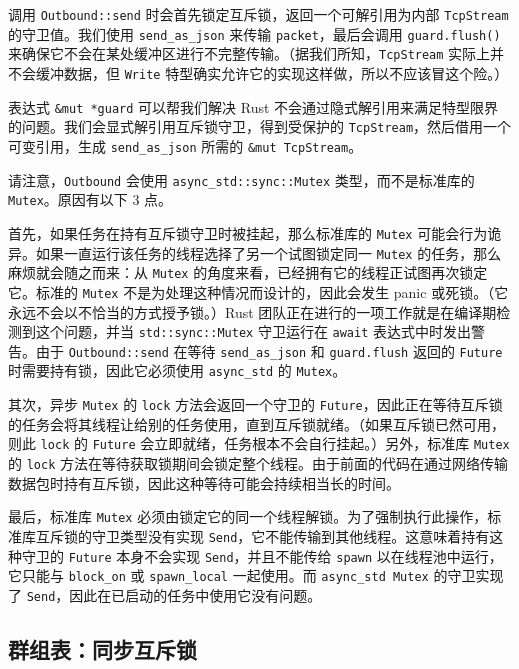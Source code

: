 调用 \texttt{Outbound::send} 时会首先锁定互斥锁，返回一个可解引用为内部 \texttt{TcpStream} 的守卫值。我们使用 \texttt{send\_as\_json} 来传输 \texttt{packet}，最后会调用 \texttt{guard.flush()} 来确保它不会在某处缓冲区进行不完整传输。（据我们所知，\texttt{TcpStream} 实际上并不会缓冲数据，但 \texttt{Write} 特型确实允许它的实现这样做，所以不应该冒这个险。）

表达式 \texttt{\&mut *guard} 可以帮我们解决 Rust 不会通过隐式解引用来满足特型限界的问题。我们会显式解引用互斥锁守卫，得到受保护的 \texttt{TcpStream}，然后借用一个可变引用，生成 \texttt{send\_as\_json} 所需的 \texttt{\&mut TcpStream}。

请注意，\texttt{Outbound} 会使用 \texttt{async\_std::sync::Mutex} 类型，而不是标准库的 \texttt{Mutex}。原因有以下 3 点。

首先，如果任务在持有互斥锁守卫时被挂起，那么标准库的 \texttt{Mutex} 可能会行为诡异。如果一直运行该任务的线程选择了另一个试图锁定同一 \texttt{Mutex} 的任务，那么麻烦就会随之而来：从 \texttt{Mutex} 的角度来看，已经拥有它的线程正试图再次锁定它。标准的 \texttt{Mutex} 不是为处理这种情况而设计的，因此会发生 panic 或死锁。（它永远不会以不恰当的方式授予锁。）Rust 团队正在进行的一项工作就是在编译期检测到这个问题，并当 \texttt{std::sync::Mutex} 守卫运行在 \texttt{await} 表达式中时发出警告。由于 \texttt{Outbound::send} 在等待 \texttt{send\_as\_json} 和 \texttt{guard.flush} 返回的 \texttt{Future} 时需要持有锁，因此它必须使用 \texttt{async\_std} 的 \texttt{Mutex}。

其次，异步 \texttt{Mutex} 的 \texttt{lock} 方法会返回一个守卫的 \texttt{Future}，因此正在等待互斥锁的任务会将其线程让给别的任务使用，直到互斥锁就绪。（如果互斥锁已然可用，则此 \texttt{lock} 的 \texttt{Future} 会立即就绪，任务根本不会自行挂起。）另外，标准库 \texttt{Mutex} 的 \texttt{lock} 方法在等待获取锁期间会锁定整个线程。由于前面的代码在通过网络传输数据包时持有互斥锁，因此这种等待可能会持续相当长的时间。

最后，标准库 \texttt{Mutex} 必须由锁定它的同一个线程解锁。为了强制执行此操作，标准库互斥锁的守卫类型没有实现 \texttt{Send}，它不能传输到其他线程。这意味着持有这种守卫的 \texttt{Future} 本身不会实现 \texttt{Send}，并且不能传给 \texttt{spawn} 以在线程池中运行，它只能与 \texttt{block\_on} 或 \texttt{spawn\_local} 一起使用。而 \texttt{async\_std Mutex} 的守卫实现了 \texttt{Send}，因此在已启动的任务中使用它没有问题。

\subsection{群组表：同步互斥锁}

